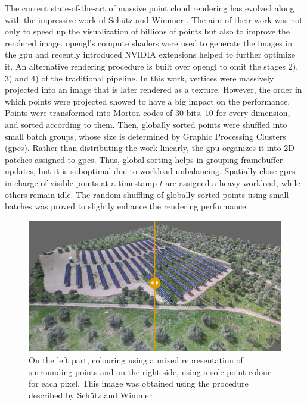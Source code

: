 The current state-of-the-art of massive point cloud rendering has evolved along with the impressive work of Schütz and Wimmer \cite{schutz_rendering_2019, schutz_rendering_2021}. The aim of their work was not only to speed up the visualization of billions of points but also to improve the rendered image. \acrshort{opengl}'s compute shaders were used to generate the images in the \acrshort{gpu} and recently introduced NVIDIA extensions helped to further optimize it. An alternative rendering procedure is built over \acrshort{opengl} to omit the stages 2), 3) and 4) of the traditional pipeline. In this work, vertices were massively projected into an image that is later rendered as a texture. However, the order in which points were projected showed to have a big impact on the performance. Points were transformed into Morton codes of 30 bits, 10 for every dimension, and sorted according to them. Then, globally sorted points were shuffled into small batch groups, whose size is determined by Graphic Processing Clusters (\acrshort{gpc}s). Rather than distributing the work linearly, the \acrshort{gpu} organizes it into 2D patches assigned to \acrshort{gpc}s. Thus, global sorting helps in grouping framebuffer updates, but it is suboptimal due to workload unbalancing. Spatially close \acrshort{gpc}s in charge of visible points at a timestamp $t$ are assigned a heavy workload, while others remain idle. The random shuffling of globally sorted points using small batches was proved to slightly enhance the rendering performance.

\begin{figure}[ht]
	\includegraphics[width=\textwidth]{figs/fundamentals/hqs_comparison.png}
	\caption{On the left part, colouring using a mixed representation of surrounding points and on the right side, using a sole point colour for each pixel. This image was obtained using the procedure described by Schütz and Wimmer \cite{schutz_rendering_2021}. }
    \label{fig:hqs_pc_rendering}
\end{figure}

